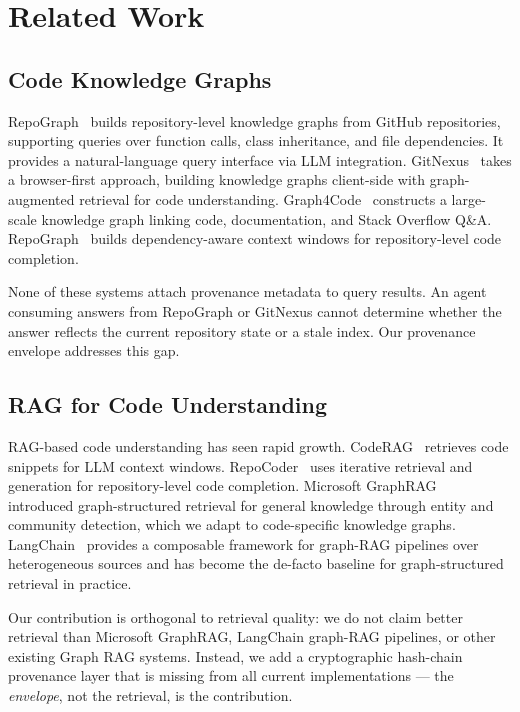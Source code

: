 \documentclass[conference]{IEEEtran}
\begin{document}
\section{Related Work}
\label{sec:related}

\subsection{Code Knowledge Graphs}

RepoGraph~\cite{CodeGraph2025} builds repository-level
knowledge graphs from GitHub repositories, supporting queries over
function calls, class inheritance, and file dependencies. It provides a
natural-language query interface via LLM integration.
GitNexus~\cite{GitNexus2026} takes a browser-first approach, building
knowledge graphs client-side with graph-augmented retrieval for code
understanding. Graph4Code~\cite{Abdelaziz2021} constructs a large-scale
knowledge graph linking code, documentation, and Stack Overflow Q\&A.
RepoGraph~\cite{RepoGraph2024} builds dependency-aware context windows
for repository-level code completion.

None of these systems attach provenance metadata to query results. An
agent consuming answers from RepoGraph or GitNexus cannot determine
whether the answer reflects the current repository state or a stale
index. Our provenance envelope addresses this gap.

\subsection{RAG for Code Understanding}

RAG-based code understanding has seen rapid growth.
CodeRAG~\cite{CodeRAG2024} retrieves code snippets for LLM context
windows. RepoCoder~\cite{RepoCoder2023} uses iterative retrieval and
generation for repository-level code completion.
Microsoft GraphRAG~\cite{Edge2024} introduced graph-structured retrieval
for general knowledge through entity and community detection, which we
adapt to code-specific knowledge graphs.
LangChain~\cite{LangChain2024} provides a composable framework for
graph-RAG pipelines over heterogeneous sources and has become the
de-facto baseline for graph-structured retrieval in practice.

Our contribution is orthogonal to retrieval quality: we do not claim
better retrieval than Microsoft GraphRAG, LangChain graph-RAG pipelines,
or other existing Graph RAG systems. Instead, we add a cryptographic
hash-chain provenance layer that is missing from all current
implementations --- the \emph{envelope}, not the retrieval, is the
contribution.
\end{document}

